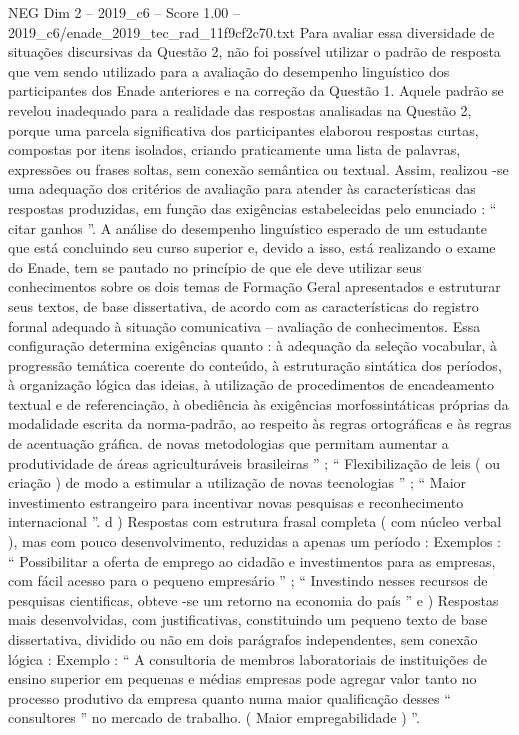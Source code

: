 \begin{textsample}{NEG Dim 2 – 2019\_c6 – Score 1.00 – 2019\_c6/enade\_2019\_tec\_rad\_11f9cf2c70.txt}
Para avaliar essa diversidade de situações discursivas da Questão 2, não foi possível utilizar o padrão de resposta que vem sendo utilizado para a avaliação do desempenho linguístico dos participantes dos Enade anteriores e na correção da Questão 1.
Aquele padrão se revelou inadequado para a realidade das respostas analisadas na Questão 2, porque uma parcela significativa dos participantes elaborou respostas curtas, compostas por itens isolados, criando praticamente uma lista de palavras, expressões ou frases soltas, sem conexão semântica ou textual.
Assim, realizou -se uma adequação dos critérios de avaliação para atender às características das respostas produzidas, em função das exigências estabelecidas pelo enunciado : “ citar ganhos ”.
A análise do desempenho linguístico esperado de um estudante que está concluindo seu curso superior e, devido a isso, está realizando o exame do Enade, tem se pautado no princípio de que ele deve utilizar seus conhecimentos sobre os dois temas de Formação Geral apresentados e estruturar seus textos, de base dissertativa, de acordo com as características do registro formal adequado à situação comunicativa – avaliação de conhecimentos.
Essa configuração determina exigências quanto : à adequação da seleção vocabular, à progressão temática coerente do conteúdo, à estruturação sintática dos períodos, à organização lógica das ideias, à utilização de procedimentos de encadeamento textual e de referenciação, à obediência às exigências morfossintáticas próprias da modalidade escrita da norma-padrão, ao respeito às regras ortográficas e às regras de acentuação gráfica. de novas metodologias que permitam aumentar a produtividade de áreas agriculturáveis brasileiras ” ; “ Flexibilização de leis ( ou criação ) de modo a estimular a utilização de novas tecnologias ” ; “ Maior investimento estrangeiro para incentivar novas pesquisas e reconhecimento internacional ”. d ) Respostas com estrutura frasal completa ( com núcleo verbal ), mas com pouco desenvolvimento, reduzidas a apenas um período : Exemplos : “ Possibilitar a oferta de emprego ao cidadão e investimentos para as empresas, com fácil acesso para o pequeno empresário ” ; “ Investindo nesses recursos de pesquisas cientificas, obteve -se um retorno na economia do país ” e ) Respostas mais desenvolvidas, com justificativas, constituindo um pequeno texto de base dissertativa, dividido ou não em dois parágrafos independentes, sem conexão lógica : Exemplo : “ A consultoria de membros laboratoriais de instituições de ensino superior em pequenas e médias empresas pode agregar valor tanto no processo produtivo da empresa quanto numa maior qualificação desses “ consultores ” no mercado de trabalho. ( Maior empregabilidade ) ”.

\end{textsample}
